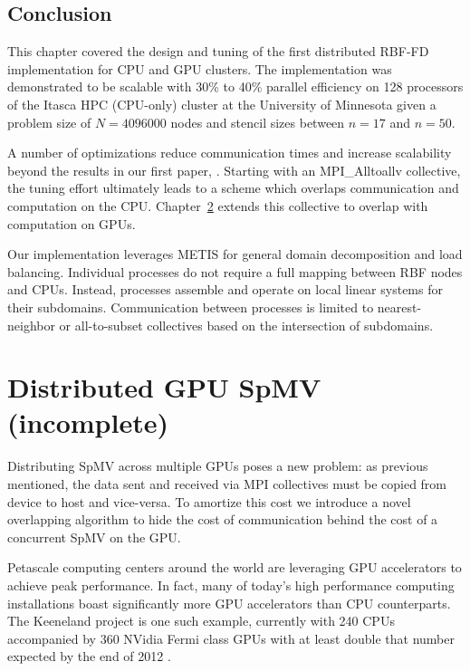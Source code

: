 \documentclass{report}
\begin{document}
\section{Conclusion}

This chapter covered the design and tuning of the first distributed RBF-FD implementation for CPU and GPU clusters. The implementation was demonstrated to be scalable with 30\% to 40\% parallel efficiency on 128 processors of the Itasca HPC (CPU-only) cluster at the University of Minnesota given a problem size of $N=4096000$ nodes and stencil sizes between $n=17$ and $n=50$. 

A number of optimizations reduce communication times and increase scalability beyond the results in our first paper, \cite{BolligFlyerErlebacher2012}. Starting with an MPI\_Alltoallv collective, the tuning effort ultimately leads to a scheme which overlaps communication and computation on the CPU. Chapter~\ref{chap:multigpu_rbffd} extends this collective to overlap with computation on GPUs. 

Our implementation leverages METIS for general domain decomposition and load balancing. Individual processes do not require a full mapping between RBF nodes and CPUs. Instead, processes assemble and operate on local linear systems for their subdomains. Communication between processes is limited to nearest-neighbor or all-to-subset collectives based on the intersection of subdomains. 
		



\chapter{Distributed GPU SpMV (incomplete)}
\label{chap:multigpu_rbffd}


\cite{Lawlor2009}

Distributing SpMV across multiple GPUs poses a new problem: as previous mentioned, the data sent and received via MPI collectives must be copied from device to host and vice-versa. To amortize this cost we introduce a novel overlapping algorithm to hide the cost of communication behind the cost of a concurrent SpMV on the GPU. 


Petascale computing centers around the world are leveraging GPU accelerators to achieve peak performance. In fact, many of today's high performance computing installations boast significantly more GPU accelerators than CPU counterparts. The Keeneland project is one such example, currently with 240 CPUs accompanied by 360 NVidia Fermi class GPUs with at least double that number expected by the end of 2012 \cite{Vetter2011}. 
\end{document}
